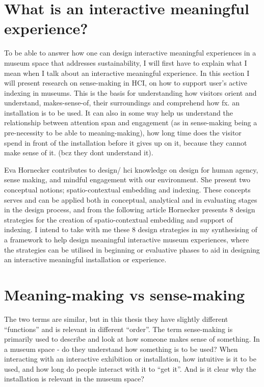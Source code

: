 \section{What is an interactive meaningful experience?}

To be able to answer how one can design interactive meaningful experiences in a museum space that addresses sustainability, I will first have to explain what I mean when I talk about an interactive meaningful experience. In this section I will present research on sense-making in HCI, on how to support user’s active indexing in museums. This is the basis for understanding how visitors orient and understand, makes-sense-of, their surroundings and comprehend how fx. an installation is to be used. It can also in some way help us understand the relationship between attention span and engagement (as in sense-making being a pre-necessity to be able to meaning-making), how long time does the visitor spend in front of the installation before it gives up on it, because they cannot make sense of it. (bcz they dont understand it).

Eva Hornecker contributes to design/ hci knowledge on design for human agency, sense making, and mindful engagement with our environment. She present two conceptual notions; spatio-contextual embedding and indexing. These concepts serves and can be applied both in conceptual, analytical and in evaluating stages in the design process, and from the following article Hornecker presents 8 design strategies for the creation of spatio-contextual embedding and support of indexing. I intend to take with me these 8 design strategies in my synthesising of a framework to help design meaningful interactive museum experiences, where the strategies can be utilised in beginning or evaluative phases to aid in designing an interactive meaningful installation or experience.


\section{Meaning-making vs sense-making}
The two terms are similar, but in this thesis they have slightly different “functions” and is relevant in different “order”. The term sense-making is primarily used to describe and look at how someone makes sense of something. In a museum space - do they understand how something is to be used? When interacting with an interactive exhibition or installation, how intuitive is it to be used, and how long do people interact with it to “get it”. And is it clear why the installation is relevant in the museum space?

